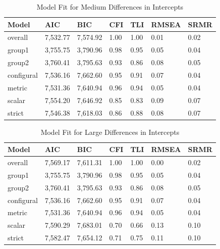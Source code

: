 \documentclass[
  man]{apa6}
\begin{document}
\begin{table}[tbp]

\begin{center}
\begin{threeparttable}

\caption{\label{tab:unnamed-chunk-6}Model Fit for Medium Differences in Intercepts}

\begin{tabular}{lllllll}
\toprule
Model & AIC & BIC & CFI & TLI & RMSEA & SRMR\\
\midrule
overall & 7,532.77 & 7,574.92 & 1.00 & 1.00 & 0.01 & 0.02\\
group1 & 3,755.75 & 3,790.96 & 0.98 & 0.95 & 0.05 & 0.04\\
group2 & 3,760.41 & 3,795.63 & 0.93 & 0.86 & 0.08 & 0.05\\
configural & 7,536.16 & 7,662.60 & 0.95 & 0.91 & 0.07 & 0.04\\
metric & 7,531.36 & 7,640.94 & 0.96 & 0.94 & 0.05 & 0.04\\
scalar & 7,554.20 & 7,646.92 & 0.85 & 0.83 & 0.09 & 0.07\\
strict & 7,546.38 & 7,618.03 & 0.86 & 0.88 & 0.08 & 0.07\\
\bottomrule
\end{tabular}

\end{threeparttable}
\end{center}

\end{table}

\begin{table}[tbp]

\begin{center}
\begin{threeparttable}

\caption{\label{tab:unnamed-chunk-7}Model Fit for Large Differences in Intercepts}

\begin{tabular}{lllllll}
\toprule
Model & AIC & BIC & CFI & TLI & RMSEA & SRMR\\
\midrule
overall & 7,569.17 & 7,611.31 & 1.00 & 1.00 & 0.00 & 0.02\\
group1 & 3,755.75 & 3,790.96 & 0.98 & 0.95 & 0.05 & 0.04\\
group2 & 3,760.41 & 3,795.63 & 0.93 & 0.86 & 0.08 & 0.05\\
configural & 7,536.16 & 7,662.60 & 0.95 & 0.91 & 0.07 & 0.04\\
metric & 7,531.36 & 7,640.94 & 0.96 & 0.94 & 0.05 & 0.04\\
scalar & 7,590.29 & 7,683.01 & 0.70 & 0.66 & 0.13 & 0.10\\
strict & 7,582.47 & 7,654.12 & 0.71 & 0.75 & 0.11 & 0.10\\
\bottomrule
\end{tabular}

\end{threeparttable}
\end{center}

\end{table}
\end{document}
